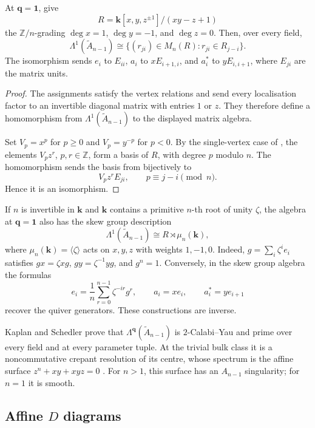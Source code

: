 \documentclass[a4paper]{amsart}
\newcommand{\kk}{\mathbf{k}}
\newcommand{\ZZ}{\mathbb{Z}}
\numberwithin{equation}{section}
\begin{document}
\begin{proposition}\label{prop:cycle-algebra}
At $\boldsymbol q=\boldsymbol1$, give
\[
 R=\kk[x,y,z^{\pm1}]/(xy-z+1)
\]
the $\ZZ/n$-grading $\deg x=1$, $\deg y=-1$, and $\deg z=0$.
Then, over every field,
\[
 \Lambda^1(\widetilde A_{n-1})\cong
 \bigl\{(r_{ji})\in M_n(R):r_{ji}\in R_{j-i}\bigr\}.
\]
The isomorphism sends $e_i$ to $E_{ii}$, $a_i$ to $xE_{i+1,i}$,
and $a_i^*$ to $yE_{i,i+1}$, where $E_{ji}$ are the matrix units.
\end{proposition}

\begin{proof}
The assignments satisfy the vertex relations and send every localisation
factor to an invertible diagonal matrix with entries $1$ or $z$.
They therefore define a homomorphism from
$\Lambda^1(\widetilde A_{n-1})$ to the displayed matrix algebra.

Set $V_p=x^p$ for $p\geq0$ and $V_p=y^{-p}$ for $p<0$.
By the single-vertex case of , the elements
$V_pz^r$, $p,r\in\ZZ$, form a basis of $R$, with degree $p$ modulo $n$.
The homomorphism sends the basis from 
bijectively to
\[
 V_pz^rE_{ji},\qquad p\equiv j-i\pmod n.
\]
Hence it is an isomorphism.
\end{proof}

If $n$ is invertible in $\kk$ and $\kk$ contains a primitive $n$-th
root of unity $\zeta$, the algebra at $\boldsymbol q=\boldsymbol1$ also has the skew group
description
\[
 \Lambda^1(\widetilde A_{n-1})\cong R\rtimes\mu_n(\kk),
\]
where $\mu_n(\kk)=\langle\zeta\rangle$ acts on $x,y,z$ with weights
$1,-1,0$. Indeed, $g=\sum_i\zeta^ie_i$ satisfies
$gx=\zeta xg$, $gy=\zeta^{-1}yg$, and $g^n=1$. Conversely, in the
skew group algebra the formulas
\[
 e_i=\frac1n\sum_{r=0}^{n-1}\zeta^{-ir}g^r,\qquad
 a_i=xe_i,\qquad a_i^*=ye_{i+1}
\]
recover the quiver generators. These constructions are inverse.

Kaplan and Schedler prove that
$\Lambda^{\boldsymbol q}(\widetilde A_{n-1})$ is $2$-Calabi--Yau
and prime over every field and at every parameter tuple. At the
trivial bulk class it is a noncommutative crepant resolution of its
centre, whose spectrum is the affine surface $z^n+xy+xyz=0$
\cite[Theorem~1.2 and Section~6.2]{KS}. For $n>1$, this surface has
an $A_{n-1}$ singularity; for $n=1$ it is smooth.

\subsection{Affine \texorpdfstring{$D$}{D} diagrams}
\end{document}
